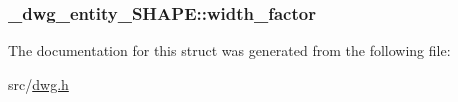 \hypertarget{struct__dwg__entity__SHAPE_a0daa9640fb33c82c444be403a9365d8e}{
\subsubsection[{width\-\_\-factor}]{ {\bf \-\_\-dwg\-\_\-entity\-\_\-\-S\-H\-A\-P\-E\-::width\-\_\-factor}}}\label{struct__dwg__entity__SHAPE_a0daa9640fb33c82c444be403a9365d8e}


\-The documentation for this struct was generated from the following file\-:\begin{DoxyCompactItemize}
\item 
src/\hyperlink{dwg_8h}{dwg.\-h}\end{DoxyCompactItemize}
